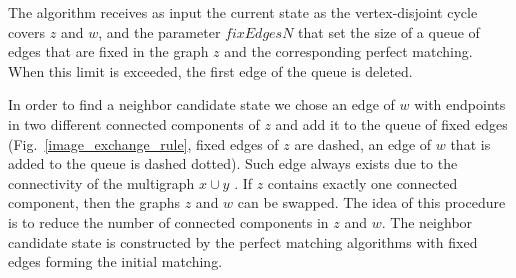 \documentclass[runningheads]{llncs}
\begin{document}
\DontPrintSemicolon
{}
\begin{algorithm}[h]
	\label{transit}
	\caption{Constructing a neighbor candidate state}
	\BlankLine
	
\end{algorithm}

The algorithm receives as input the current state as the vertex-disjoint cycle covers $z$ and $w$, and the parameter $fixEdgesN$ that set the size of a queue of edges that are fixed in the graph $z$ and the corresponding perfect matching.
When this limit is exceeded, the first edge of the queue is deleted. %

In order to find a neighbor candidate state we chose an edge of $w$ with endpoints in two different connected components of $z$ and add it to the queue of fixed edges (Fig.~\ref{image_exchange_rule}, fixed edges of $z$ are dashed, an edge of $w$ that is added to the queue is dashed dotted).
Such edge always exists due to the connectivity of the multigraph $x \cup y$ . 
If $z$ contains exactly one connected component, then the graphs $z$ and $w$ can be swapped. 
The idea of this procedure is to reduce the number of connected components in $z$ and $w$.
The neighbor candidate state is constructed by the perfect matching algorithms with fixed edges forming the initial matching.
\end{document}
